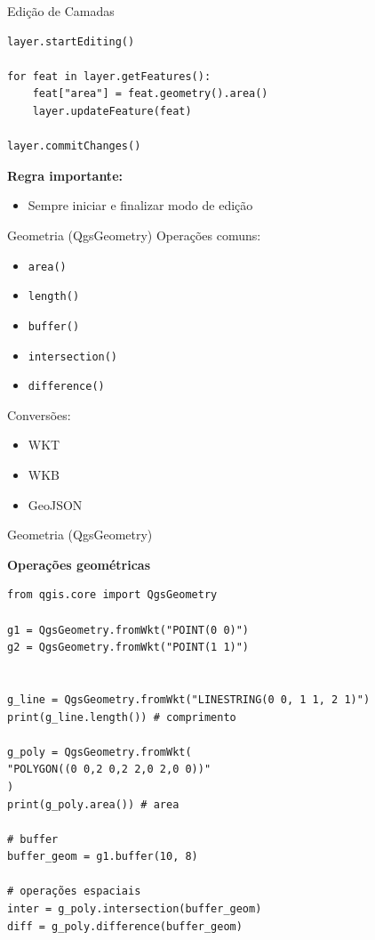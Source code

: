 \documentclass{beamer}
\begin{document}
\begin{frame}[fragile]{Edição de Camadas}
    \begin{verbatim}
layer.startEditing()

for feat in layer.getFeatures():
    feat["area"] = feat.geometry().area()
    layer.updateFeature(feat)

layer.commitChanges()
    \end{verbatim}
    
    \vspace{0.3cm}
    
    \textbf{Regra importante:}
    \begin{itemize}
        \item Sempre iniciar e finalizar modo de edição
    \end{itemize}
\end{frame}

\begin{frame}{Geometria (QgsGeometry)}
    Operações comuns:
    
    \begin{itemize}
        \item \texttt{area()}
        \item \texttt{length()}
        \item \texttt{buffer()}
        \item \texttt{intersection()}
        \item \texttt{difference()}
    \end{itemize}
    
    \vspace{0.4cm}
    
    Conversões:
    \begin{itemize}
        \item WKT
        \item WKB
        \item GeoJSON
    \end{itemize}
\end{frame}

\begin{frame}[fragile]{Geometria (QgsGeometry)}
    
    \textbf{Operações geométricas}
    
    \begin{verbatim}
from qgis.core import QgsGeometry

g1 = QgsGeometry.fromWkt("POINT(0 0)")
g2 = QgsGeometry.fromWkt("POINT(1 1)")


g_line = QgsGeometry.fromWkt("LINESTRING(0 0, 1 1, 2 1)")
print(g_line.length()) # comprimento 

g_poly = QgsGeometry.fromWkt(
"POLYGON((0 0,2 0,2 2,0 2,0 0))"
)
print(g_poly.area()) # area

# buffer
buffer_geom = g1.buffer(10, 8)

# operações espaciais
inter = g_poly.intersection(buffer_geom)
diff = g_poly.difference(buffer_geom)
    \end{verbatim}


    
\end{frame}
\end{document}
